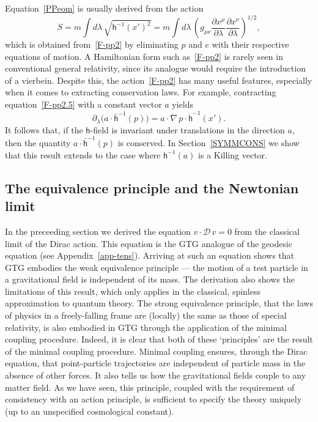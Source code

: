 \documentclass[a4paper]{article}
\numberwithin{equation}{section}
\newcommand{\dt}{\! \cdot \!}
\newcommand{\lam}{\lambda}
\newcommand{\cld}{{\mathcal{D}}}
\newcommand{\lih}{\mathsf{h}}
\newcommand{\lbh}{\bar{\mathsf{h}}}
\newcommand{\ho}{\lbh}
\newcommand{\hu}{\lih}
\newcommand{\grad}{\nabla}
\newcommand{\dgrad}{\dot{\grad}}
\newcommand{\deriv}[2]{\frac{\partial #1}{\partial #2}}
\begin{document}
Equation~\eqref{PPeom} is usually derived from the action
%
\begin{equation}
S = m \int d\lam \, \sqrt{\hu^{-1}(x')^2} = m \int d\lam \, \left(
g_{\mu\nu} \deriv{x^\mu}{\lam} \deriv{x^\nu}{\lam} \right)^{1/2}  ,
\end{equation}
%
which is obtained from~\eqref{F-pp2} by eliminating $p$ and $e$ with
their respective equations of motion.  A Hamiltonian form such
as~\eqref{F-pp2} is rarely seen in conventional general relativity,
since its analogue would require the introduction of a vierbein.
Despite this, the action~\eqref{F-pp2} has many useful features,
especially when it comes to extracting conservation laws.  For
example, contracting equation~\eqref{F-pp2.5} with a constant vector
$a$ yields
%
\begin{equation}
\partial_\lam \bigl( a \dt \ho^{-1}(p) \bigr) = a\dt \dgrad \,  p \dt
\dot{\hu}^{-1}(x' ). 
\label{PP-cons}
\end{equation}
%
It follows that, if the $\lih$-field is invariant under translations
in the direction $a$, then the quantity $a\cdot\ho^{-1}(p)$ is
conserved.  In Section~\ref{SYMMCONS} we show that this result extends
to the case where $\hu^{-1}(a)$ is a Killing vector.



\subsection{The equivalence principle and the Newtonian limit} 


In the preceeding section we derived the equation $v\dt\cld\, v=0$ from
the classical limit of the Dirac action.  This equation is the GTG
analogue of the geodesic equation (see Appendix~\ref{app-tens}).
Arriving at such an equation shows that GTG embodies the weak
equivalence principle --- the motion of a test particle in a
gravitational field is independent of its mass.  The derivation also
shows the limitations of this result, which only applies in the
classical, spinless approximation to quantum theory.  The strong
equivalence principle, that the laws of physics in a freely-falling
frame are (locally) the same as those of special relativity, is also
embodied in GTG through the application of the minimal coupling
procedure.  Indeed, it is clear that both of these `principles' are
the result of the minimal coupling procedure.  Minimal coupling
ensures, through the Dirac equation, that point-particle trajectories
are independent of particle mass in the absence of other forces.  It
also tells us how the gravitational fields couple to any matter field.
As we have seen, this principle, coupled with the requirement of
consistency with an action principle, is sufficient to specify the
theory uniquely (up to an unspecified cosmological constant).
\end{document}
